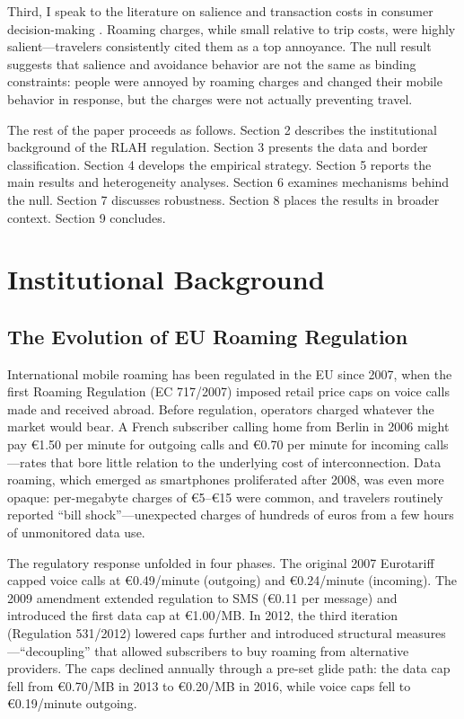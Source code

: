\documentclass[12pt]{article}
\newcommand{\EUR}[1]{\euro#1}
\begin{document}
Third, I speak to the literature on salience and transaction costs in consumer decision-making \citep{chetty2009}. Roaming charges, while small relative to trip costs, were highly salient---travelers consistently cited them as a top annoyance. The null result suggests that salience and avoidance behavior are not the same as binding constraints: people were annoyed by roaming charges and changed their mobile behavior in response, but the charges were not actually preventing travel.

The rest of the paper proceeds as follows. Section 2 describes the institutional background of the RLAH regulation. Section 3 presents the data and border classification. Section 4 develops the empirical strategy. Section 5 reports the main results and heterogeneity analyses. Section 6 examines mechanisms behind the null. Section 7 discusses robustness. Section 8 places the results in broader context. Section 9 concludes.


\section{Institutional Background}

\subsection{The Evolution of EU Roaming Regulation}

International mobile roaming has been regulated in the EU since 2007, when the first Roaming Regulation (EC 717/2007) imposed retail price caps on voice calls made and received abroad. Before regulation, operators charged whatever the market would bear. A French subscriber calling home from Berlin in 2006 might pay \EUR{1.50} per minute for outgoing calls and \EUR{0.70} per minute for incoming calls---rates that bore little relation to the underlying cost of interconnection. Data roaming, which emerged as smartphones proliferated after 2008, was even more opaque: per-megabyte charges of \EUR{5}--\EUR{15} were common, and travelers routinely reported ``bill shock''---unexpected charges of hundreds of euros from a few hours of unmonitored data use.

The regulatory response unfolded in four phases. The original 2007 Eurotariff capped voice calls at \EUR{0.49}/minute (outgoing) and \EUR{0.24}/minute (incoming). The 2009 amendment extended regulation to SMS (\EUR{0.11} per message) and introduced the first data cap at \EUR{1.00}/MB. In 2012, the third iteration (Regulation 531/2012) lowered caps further and introduced structural measures---``decoupling'' that allowed subscribers to buy roaming from alternative providers. The caps declined annually through a pre-set glide path: the data cap fell from \EUR{0.70}/MB in 2013 to \EUR{0.20}/MB in 2016, while voice caps fell to \EUR{0.19}/minute outgoing.
\end{document}

